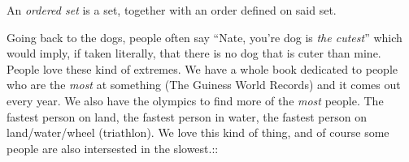 \begin{definition}\label{def:ordered-set}
    An \emph{ordered set} is a set, together with an order defined on said set.
\end{definition}

Going back to the dogs, people often say ``Nate, you're dog is \emph{the
cutest}'' which would imply, if taken literally, that there is no dog that is
cuter than mine. People love these kind of extremes. We have a whole book
dedicated to people who are the \emph{most} at something (The Guiness World
Records) and it comes out every year. We also have the olympics to find more of
the \emph{most} people. The fastest person on land, the fastest person in
water, the fastest person on land/water/wheel (triathlon). We love this kind of
thing, and of course some people are also intersested in the slowest.::
